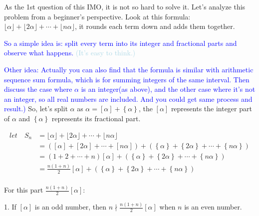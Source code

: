 \documentclass{Math_Note}
\begin{document}
\begin{sol}
As the 1st question of this IMO, it is not so hard to solve it. Let's analyze this problem from a beginner's perspective.
\newline\newline
Look at this formula: $\lfloor\alpha\rfloor + \lfloor 2 \alpha \rfloor + \cdots + \lfloor n\alpha \rfloor$, it rounds each 
term down and adds them together. 

\marginpar{\textcolor{green}{idea}} 
\textcolor{blue}{So a simple idea is: split every term into its integer and fractional parts and observe what happens.} \textcolor{lightblue}{(It's easy to think.)}

\textcolor{blue}{Other idea: Actually you can also find that the formula is similar with arithmetic sequence sum formula, which is 
for summing integers of the same interval. Then discuss the case where $\alpha$ is an integer(as above), and the other case 
where it's not an integer, so all real numbers are included. And you could get same process and result.)}
\newline\newline
\marginpar{\textcolor{green}{solution}}
So, let's split $\alpha$ as $\alpha = [\alpha]+\left\{\alpha\right\}$, the $[\alpha]$ represents the integer part of $\alpha$ and 
$\left\{\alpha\right\}$ represents its fractional part.

\begin{equation}
    \begin{split}
        let\quad S_{n} &= \lfloor\alpha\rfloor + \lfloor2\alpha\rfloor + \cdots + \lfloor n\alpha \rfloor \\
        &= \left(\left[\alpha\right]+\left[2\alpha\right]+\cdots+\left[n\alpha\right]\right) 
           + \left(\left\{\alpha\right\}+\left\{2\alpha\right\}+\cdots+\left\{n\alpha\right\}\right) \\
        &= \left(1+2+\cdots+n\right)\left[\alpha\right] + \left(\left\{\alpha\right\}+\left\{2\alpha\right\}+\cdots+\left\{n\alpha\right\}\right) \\
        &= \frac{n\left(1+n\right)}{2}\left[\alpha\right] + \left(\left\{\alpha\right\}+\left\{2\alpha\right\}+\cdots+\left\{n\alpha\right\}\right) \\
    \end{split}
\end{equation}

For this part $\frac{n\left(1+n\right)}{2}\left[\alpha\right]$:

1. If $\left[\alpha\right]$ is an odd number, then $n\nmid\frac{n\left(1+n\right)}{2}\left[\alpha\right]$ when $n$ is an even number.


\end{sol}
\end{document}
